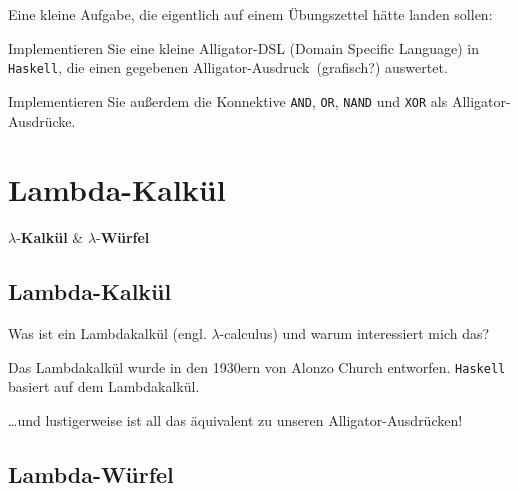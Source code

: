 \documentclass{beamer}
\begin{document}
\begin{frame}

Eine kleine Aufgabe, die eigentlich auf einem Übungszettel hätte landen sollen:\pause\bigskip

Implementieren Sie eine kleine Alligator-DSL (Domain Specific Language) in \texttt{Haskell}, die einen gegebenen \glqq Alligator-Ausdruck\grqq\ (grafisch?) auswertet.\bigskip

Implementieren Sie außerdem die Konnektive \texttt{AND}, \texttt{OR}, \texttt{NAND} und \texttt{XOR} als Alligator-Ausdrücke. 

\end{frame}

\section*{Lambda-Kalkül}

\begin{frame}

\begin{center}
\Large $\lambda$-\textbf{Kalkül} \& $\lambda$-\textbf{Würfel} \normalsize
\end{center}

\end{frame}

\subsection*{Lambda-Kalkül}

\begin{frame}
Was ist ein Lambdakalkül (engl. $\lambda$-calculus) und warum interessiert mich das?
\pause\bigskip

Das Lambdakalkül wurde in den 1930ern von Alonzo Church entworfen. \texttt{Haskell} basiert auf dem Lambdakalkül.

\pause\bigskip
\dots und lustigerweise ist all das äquivalent zu unseren Alligator-Ausdrücken!
\end{frame}

\subsection*{Lambda-Würfel}
\end{document}
